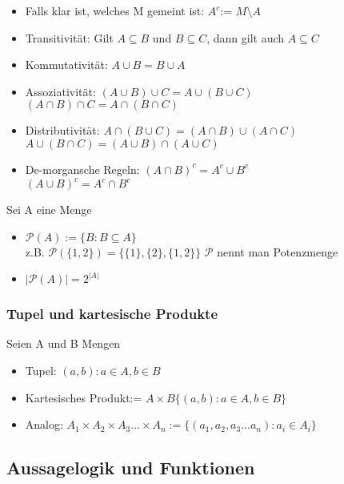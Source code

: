 \documentclass{article}
\begin{document}
	\begin{itemize}
	\item Falls klar ist, welches M gemeint ist: $A^c$:= $M \setminus A$
	\item Transitivität: Gilt $A \subseteq B$ und $B \subseteq C$, dann gilt auch $A \subseteq C$
	\item Kommutativität: $A \cup B = B \cup A$

	\item Assoziativität:  \tabto{2.5cm} $(A \cup B) \cup C = A \cup (B \cup C)$ \\
	\tabto{2.5cm} $(A \cap B) \cap C = A \cap (B \cap C)$
	\item Distributivität: \tabto{2.5cm} $A \cap (B \cup C) = (A \cap B) \cup (A \cap C)$\\
	\tabto{2.5cm} $A \cup (B \cap C) = (A \cup B) \cap (A \cup C)$
	\item De-morgansche Regeln: \tabto{3.8cm} $(A \cap B)^c = A^c \cup B^c$\\
	\tabto{3.8cm} $(A \cup B)^c = A^c \cap B^c$
	\end{itemize}
	Sei A eine Menge
	\begin{itemize}
	\item $\mathcal{P}(A):= \{B: B \subseteq A\}$\\
	\tabto{1cm} z.B. $\mathcal{P}(\{1,2\}) = \{\{1\}, \{2\}, \{1,2\}\}$ \tabto{7cm} $\mathcal{P}$ nennt man Potenzmenge  
	\item $| \mathcal{P}(A) | = 2^{| A | }$
	\end{itemize}
	\subsubsection{Tupel und kartesische Produkte}
	Seien A und B Mengen
	\begin{itemize}
	\item Tupel: $(a,b): a \in A, b \in B$
	\item Kartesisches Produkt:= $A \times B \{(a,b): a \in A, b \in B\}$
	\item Analog: $A_1 \times A_2 \times A_3 ... \times A_n :=\{(a_1, a_2, a_3 ... a_n): a_i \in A_i\}$
	\end{itemize}
	
	\subsection{Aussagelogik und Funktionen}
\end{document}
